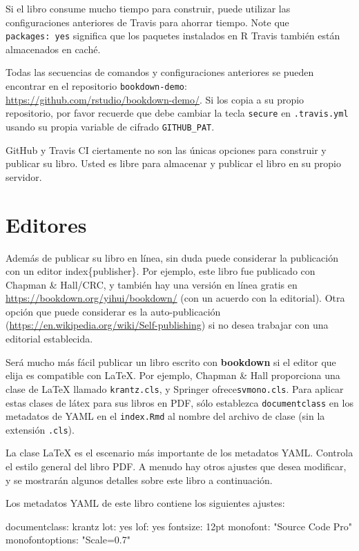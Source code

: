 \documentclass[12pt,]{krantz}
\makeatletter
\newenvironment{Shaded}{\begin{snugshade}}{\end{snugshade}}
\newcommand{\StringTok}[1]{\textcolor[rgb]{0.31,0.60,0.02}{#1}}
\newcommand{\FunctionTok}[1]{\textcolor[rgb]{0.00,0.00,0.00}{#1}}
\newcommand{\AttributeTok}[1]{\textcolor[rgb]{0.77,0.63,0.00}{#1}}
\newenvironment{kframe}{%
\medskip{}
\setlength{\fboxsep}{.8em}
 \def\at@end@of@kframe{}%
 \ifinner\ifhmode%
  \def\at@end@of@kframe{\end{minipage}}%
  \begin{minipage}{\columnwidth}%
 \fi\fi%
 \def\FrameCommand##1{\hskip\@totalleftmargin \hskip-\fboxsep
 \colorbox{shadecolor}{##1}\hskip-\fboxsep
     \hskip-\linewidth \hskip-\@totalleftmargin \hskip\columnwidth}%
 \MakeFramed {\advance\hsize-\width
   \@totalleftmargin\z@ \linewidth\hsize
   \@setminipage}}%
 {\par\unskip\endMakeFramed%
 \at@end@of@kframe}
\renewenvironment{Shaded}{\begin{kframe}}{\end{kframe}}
\theoremstyle{definition}
\theoremstyle{definition}
\theoremstyle{definition}
\theoremstyle{remark}
\makeatother
\begin{document}
Si el libro consume mucho tiempo para construir, puede utilizar las
configuraciones anteriores de Travis para ahorrar tiempo. Note que
\texttt{packages:\ yes} significa que los paquetes instalados en R
Travis también están almacenados en caché.

Todas las secuencias de comandos y configuraciones anteriores se pueden
encontrar en el repositorio \texttt{bookdown-demo}:
\url{https://github.com/rstudio/bookdown-demo/}. Si los copia a su
propio repositorio, por favor recuerde que debe cambiar la tecla
\texttt{secure} en \texttt{.travis.yml} usando su propia variable de
cifrado \texttt{GITHUB\_PAT}.

GitHub y Travis CI ciertamente no son las únicas opciones para construir
y publicar su libro. Usted es libre para almacenar y publicar el libro
en su propio servidor.

\section{Editores}\label{editores}

Además de publicar su libro en línea, sin duda puede considerar la
publicación con un editor index\{publisher\}. Por ejemplo, este libro
fue publicado con Chapman \& Hall/CRC, y también hay una versión en
línea gratis en \url{https://bookdown.org/yihui/bookdown/} (con un
acuerdo con la editorial). Otra opción que puede considerar es la
auto-publicación (\url{https://en.wikipedia.org/wiki/Self-publishing})
si no desea trabajar con una editorial establecida.

Será mucho más fácil publicar un libro escrito con \textbf{bookdown} si
el editor que elija es compatible con LaTeX.  Por ejemplo,
Chapman \& Hall proporciona una clase de LaTeX llamado
\texttt{krantz.cls}, y Springer ofrece\texttt{svmono.cls}. Para aplicar
estas clases de látex para sus libros en PDF, sólo establezca
\texttt{documentclass} en los metadatos de YAML en el \texttt{index.Rmd}
al nombre del archivo de clase (sin la extensión \texttt{.cls}).

La clase LaTeX es el escenario más importante de los metadatos YAML.
Controla el estilo general del libro PDF. A menudo hay otros ajustes que
desea modificar, y se mostrarán algunos detalles sobre este libro a
continuación.

Los metadatos YAML de este libro contiene los siguientes ajustes:

\begin{Shaded}
\begin{Highlighting}[]
\FunctionTok{documentclass:}\AttributeTok{ krantz}
\FunctionTok{lot:}\AttributeTok{ yes}
\FunctionTok{lof:}\AttributeTok{ yes}
\FunctionTok{fontsize:}\AttributeTok{ 12pt}
\FunctionTok{monofont:}\AttributeTok{ }\StringTok{"Source Code Pro"}
\FunctionTok{monofontoptions:}\AttributeTok{ }\StringTok{"Scale=0.7"}
\end{Highlighting}
\end{Shaded}
\end{document}
